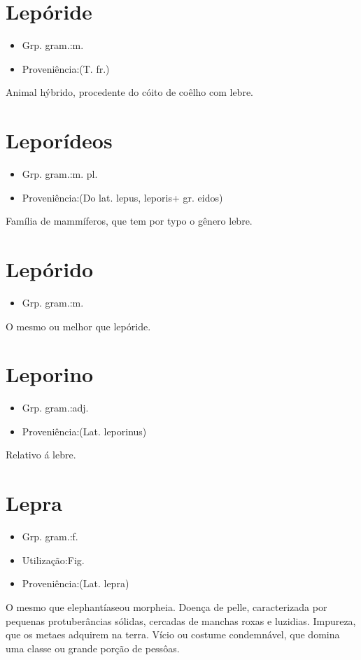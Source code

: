 \section{Lepóride}
\begin{itemize}
\item {Grp. gram.:m.}
\end{itemize}
\begin{itemize}
\item {Proveniência:(T. fr.)}
\end{itemize}
Animal hýbrido, procedente do cóito de coêlho com lebre.
\section{Leporídeos}
\begin{itemize}
\item {Grp. gram.:m. pl.}
\end{itemize}
\begin{itemize}
\item {Proveniência:(Do lat. \textunderscore lepus\textunderscore , \textunderscore leporis\textunderscore  + gr. \textunderscore eidos\textunderscore )}
\end{itemize}
Família de mammíferos, que tem por typo o gênero lebre.
\section{Lepórido}
\begin{itemize}
\item {Grp. gram.:m.}
\end{itemize}
O mesmo ou melhor que \textunderscore lepóride\textunderscore .
\section{Leporino}
\begin{itemize}
\item {Grp. gram.:adj.}
\end{itemize}
\begin{itemize}
\item {Proveniência:(Lat. \textunderscore leporinus\textunderscore )}
\end{itemize}
Relativo á lebre.
\section{Lepra}
\begin{itemize}
\item {Grp. gram.:f.}
\end{itemize}
\begin{itemize}
\item {Utilização:Fig.}
\end{itemize}
\begin{itemize}
\item {Proveniência:(Lat. \textunderscore lepra\textunderscore )}
\end{itemize}
O mesmo que \textunderscore elephantíase\textunderscore  ou \textunderscore morpheia\textunderscore .
Doença de pelle, caracterizada por pequenas protuberâncias sólidas, cercadas de manchas roxas e luzidias.
Impureza, que os metaes adquirem na terra.
Vício ou costume condemnável, que domina uma classe ou grande porção de pessôas.

